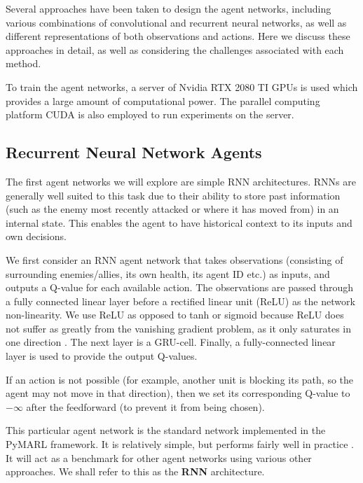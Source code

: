 Several approaches have been taken to design the agent networks, including various combinations of convolutional and recurrent neural networks, as well as different representations of both observations and actions. Here we discuss these approaches in detail, as well as considering the challenges associated with each method.



To train the agent networks, a server of Nvidia RTX 2080 TI GPUs is used which provides a large amount of computational power. The parallel computing platform CUDA \cite{cuda} is also employed to run experiments on the server.




\subsection{Recurrent Neural Network Agents}


The first agent networks we will explore are simple RNN architectures. RNNs are generally well suited to this task due to their ability to store past information (such as the enemy most recently attacked or where it has moved from) in an internal state. This enables the agent to have historical context to its inputs and own decisions.

We first consider an RNN agent network that takes observations (consisting of surrounding enemies/allies, its own health, its agent ID etc.) as inputs, and outputs a Q-value for each available action. The observations are passed through a fully connected linear layer before a rectified linear unit (ReLU) as the network non-linearity. We use ReLU as opposed to tanh or sigmoid because ReLU does not suffer as greatly from the vanishing gradient problem, as it only saturates in one direction \cite{relu}. The next layer is a GRU-cell. Finally, a fully-connected linear layer is used to provide the output Q-values.

If an action is not possible (for example, another unit is blocking its path, so the agent may not move in that direction), then we set its corresponding Q-value to $-\infty$ after the feedforward (to prevent it from being chosen).

This particular agent network is the standard network implemented in the PyMARL framework. It is relatively simple, but performs fairly well in practice \cite{smac}. It will act as a benchmark for other agent networks using various other approaches. We shall refer to this as the \textbf{RNN} architecture.


